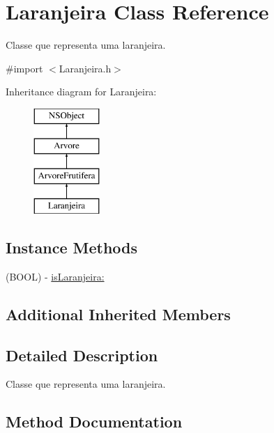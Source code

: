 \hypertarget{interface_laranjeira}{}\section{Laranjeira Class Reference}
\label{interface_laranjeira}


Classe que representa uma laranjeira.  




{\ttfamily \#import $<$Laranjeira.\+h$>$}

Inheritance diagram for Laranjeira\+:\begin{figure}[H]
\begin{center}
\leavevmode
\includegraphics[height=4.000000cm]{interface_laranjeira}
\end{center}
\end{figure}
\subsection*{Instance Methods}
\begin{DoxyCompactItemize}
\item 
(B\+O\+O\+L) -\/ \hyperlink{interface_laranjeira_aaee758b935796457da4d711d7629e6f6}{is\+Laranjeira\+:}
\end{DoxyCompactItemize}
\subsection*{Additional Inherited Members}


\subsection{Detailed Description}
Classe que representa uma laranjeira. 

\subsection{Method Documentation}
\hypertarget{interface_laranjeira_aaee758b935796457da4d711d7629e6f6}{}
